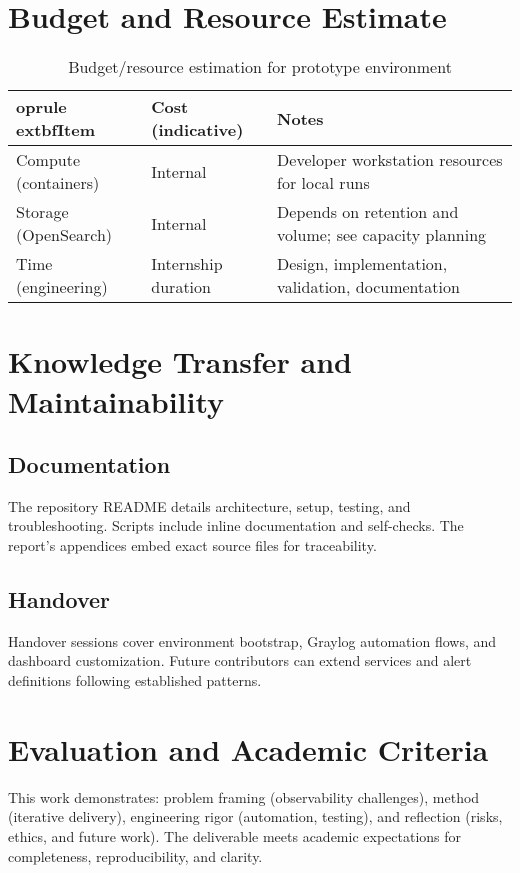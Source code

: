 \documentclass[12pt,a4paper]{report}
\begin{document}
\chapter{Budget and Resource Estimate}
\begin{table}[H]
\centering
\begin{tabular}{p{5cm} p{4cm} p{6cm}}
	oprule
	extbf{Item} & \textbf{Cost (indicative)} & \textbf{Notes} \\
\midrule
Compute (containers) & Internal & Developer workstation resources for local runs \\
Storage (OpenSearch) & Internal & Depends on retention and volume; see capacity planning \\
Time (engineering) & Internship duration & Design, implementation, validation, documentation \\
\bottomrule
\end{tabular}
\caption{Budget/resource estimation for prototype environment}
\end{table}

\chapter{Knowledge Transfer and Maintainability}
\section{Documentation}
The repository README details architecture, setup, testing, and troubleshooting. Scripts include inline documentation and self-checks. The report’s appendices embed exact source files for traceability.

\section{Handover}
Handover sessions cover environment bootstrap, Graylog automation flows, and dashboard customization. Future contributors can extend services and alert definitions following established patterns.

\chapter{Evaluation and Academic Criteria}
This work demonstrates: problem framing (observability challenges), method (iterative delivery), engineering rigor (automation, testing), and reflection (risks, ethics, and future work). The deliverable meets academic expectations for completeness, reproducibility, and clarity.
\end{document}
